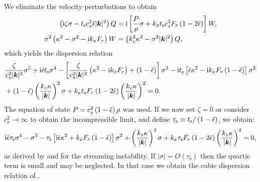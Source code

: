 We eliminate the velocity perturbations to obtain
\begin{align}
  \left(\mathrm{i} \zeta \sigma - t_\mathrm{s} c_s^2 \tilde{\epsilon} |\bm{k}|^2\right)Q &=
  \mathrm{i} \left[
  \frac{P}{\rho}\sigma + k_xt_\mathrm{s} c_s^2 F_r\left(1 -
  2\tilde{\epsilon}\right)\right]W, \\
   \sigma^2 \left( \kappa^2 - \sigma^2 - \mathrm{i} k_x F_r\right)W &=
    \left(k_z^2\kappa^2 - \sigma^2|\bm{k}|^2\right)Q, 
\end{align}
which yields the dispersion relation
\begin{align}
  &\frac{\zeta}{c_s^2|\bm{k}|^2}\sigma^5 + \mathrm{i} \tilde{\epsilon} t_\mathrm{s}
  \sigma^4 - \left[ \frac{\zeta}{c_s^2|\bm{k}|^2} \left(\kappa^2 - \mathrm{i}
  k_x F_r\right) + \left(1 - \tilde{\epsilon}\right)\right]\sigma^3 - \mathrm{i}
  t_\mathrm{s} \left[\tilde{\epsilon} \kappa^2 - \mathrm{i} k_x F_r\left( 1 -
  \tilde{\epsilon}\right)\right]\sigma^2 \notag\\ 
  &+ \left(1 -
  \tilde{\epsilon}\right)\left(\frac{k_z\kappa}{|\bm{k}|}\right)^2\sigma +
  k_x t_\mathrm{s} F_r\left(1 - 2\tilde{\epsilon}\right)
  \left(\frac{k_z\kappa}{|\bm{k}|}\right)^2  = 0.
\end{align}
The equation of state $P = c_s^2\left( 1 - \tilde{\epsilon}\right)\rho$
was used. If we now set $\zeta = 0$ or consider $c_s^2\to \infty$ to
obtain the 
incompressible limit, and define $\tau_\mathrm{s} \equiv
t_\mathrm{s}/\left(1 - \tilde{\epsilon}\right)$, we obtain: 
\begin{align*}
\mathrm{i} \tilde{\epsilon} \tau_\mathrm{s}
  \sigma^4 - \sigma^3 - 
  \tau_\mathrm{s} \left[ \mathrm{i} \tilde{\epsilon} \kappa^2 + k_x F_r\left( 1 -
  \tilde{\epsilon}\right)\right]\sigma^2 
  + \left(\frac{k_z\kappa}{|\bm{k}|}\right)^2\sigma + 
  k_x \tau_\mathrm{s} F_r\left(1 - 2\tilde{\epsilon}\right)
  \left(\frac{k_z\kappa}{|\bm{k}|}\right)^2  = 0,
\end{align*}
as derived by \cite{jacquet11} and \cite{laibe14} for the streaming
instability. If $|\sigma| = O(\tau_\mathrm{s})$ then the quartic term
is small and may be neglected. In that case we obtain the cubic
dispersion relation of \citet{youdin05a}. 

